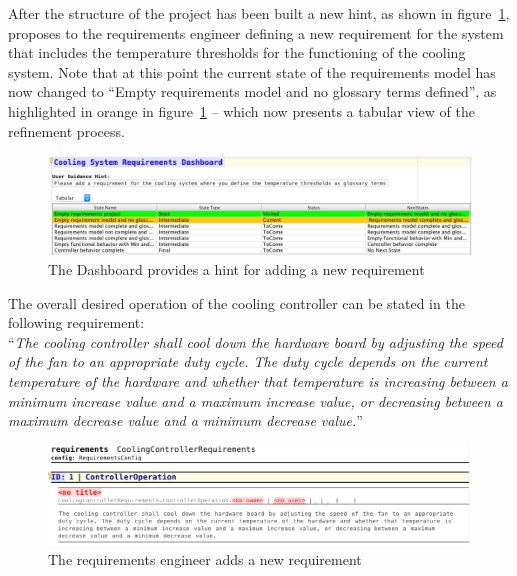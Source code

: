 
After the structure of the project has been built a new hint, as shown in
figure~\ref{fig:dashboard_newreq}, proposes to
the requirements engineer defining a new requirement for the system that
includes the temperature thresholds for the functioning of the cooling system.
Note that at this point the current state of the requirements model has now
changed to ``Empty requirements model and no glossary terms defined'', as
highlighted in orange in figure~\ref{fig:dashboard_newreq} -- which now presents
a tabular view of the refinement process.

\begin{figure}[!h]
\centering 
\includegraphics[width=1\textwidth]{./figures/DefineCoolingReq.png}
\caption{The Dashboard provides a hint for adding a new requirement}
\label{fig:dashboard_newreq}
\end{figure}

The overall desired operation of the cooling controller can be stated in the
following requirement:\\

``\emph{The cooling controller shall cool down the hardware board by adjusting
the speed of the fan to an appropriate duty cycle. The duty cycle depends on the
current temperature of the hardware and whether that temperature is increasing
between a minimum increase value and a maximum increase value, or decreasing
between a maximum decrease value and a minimum decrease value.}''\\
 
\begin{figure}[!h]
\centering 
\includegraphics[width=1\textwidth]{./figures/textReqIncomplete.png}
\caption{The requirements engineer adds a new requirement}
\label{fig:new_req}
\end{figure}

